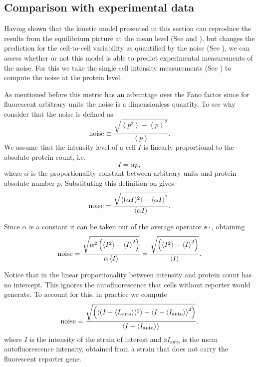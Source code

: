 \subsection{Comparison with experimental data}

Having shown that the kinetic model presented in this section can reproduce the
results from the equilibrium picture at the mean level (See
 and ), but changes the
prediction for the cell-to-cell variability as quantified by the noise
(See ), we can assess whether or not this model is
able to predict experimental measurements of the noise. For this we take the
single cell intensity measurements (See ) to
compute the noise at the protein level.

As mentioned before this metric has an advantage over the Fano factor since for
fluorescent arbitrary units the noise is a dimensionless quantity. To see
why consider that the noise is defined as
\begin{equation}
\text{noise} \equiv \frac{\sqrt{\left\langle p^2 \right\rangle -
                        \left\langle p \right\rangle^2}}
                        {\left\langle p \right\rangle}.
    \label{seq_noise_protein}
\end{equation}
We assume that the intensity level of a cell $I$ is linearly proportional to
the absolute protein count, i.e.
\begin{equation}
I = \alpha p,
\label{seq_calibration_factor}
\end{equation}
where $\alpha$ is the proportionality constant between arbitrary units and
protein absolute number $p$. Substituting this definition on
 gives
\begin{equation}
  \text{noise} = {\sqrt{\left\langle (\alpha I)^2 \right\rangle - \left\langle \alpha I \right\rangle^2} \over
                \left\langle \alpha I \right\rangle}.
\end{equation}

Since $\alpha$ is a constant it can be taken out of the average operator
$\ee{\cdot}$, obtaining
\begin{equation}
  \text{noise} = {\sqrt{\alpha^2 \left(\left\langle I^2 \right\rangle -
                \left\langle I \right\rangle^2 \right)} \over
                \alpha \left\langle I \right\rangle}
       = {\sqrt{\left(\left\langle I^2 \right\rangle - \left\langle I \right\rangle^2 \right)} \over
                \left\langle I \right\rangle}.
\end{equation}

Notice that in  the linear proportionality between
intensity and protein count has no intercept. This ignores the autofluorescence
that cells without reporter would generate. To account for this, in practice we
compute
\begin{equation}
\text{noise} = {\sqrt{\left(\left\langle (I - \left\langle I_\text{auto} \right\rangle)^2 \right\rangle -
                    \left\langle I - \left\langle I_\text{auto} \right\rangle \right\rangle^2 \right)} \over
                \left\langle I - \left\langle I_\text{auto} \right\rangle \right\rangle}.
\end{equation}
where $I$ is the intensity of the strain of interest and $\ee{I_\text{auto}}$ is
the mean autofluorescence intensity, obtained from a strain that does not carry
the fluorescent reporter gene.

